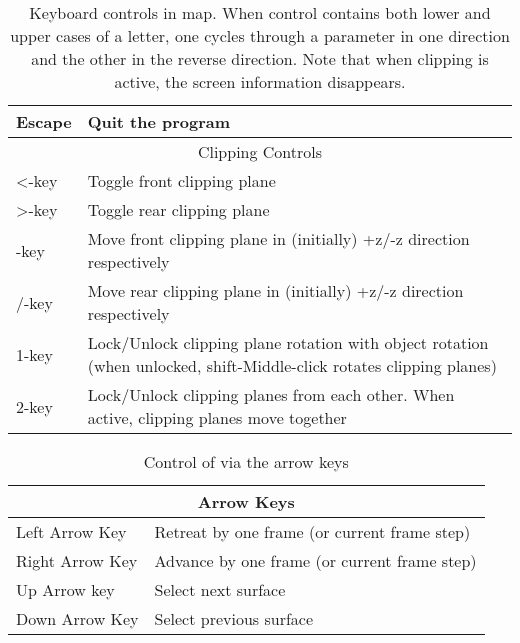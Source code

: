 \begin{table}[htbp]
\begin{center}
\begin{tabular}{|l|p{4in}|}
        Escape  &       Quit the program \\ \hline
        \multicolumn{2}{|c|}{Clipping Controls} \\ \hline
	<-key	& 	Toggle front clipping plane \\ \hline
        >-key   &       Toggle rear clipping plane \\ \hline
        [/]-key   &     Move front clipping plane in (initially) +z/-z
	direction respectively \\ \hline
	{/}-key   &	Move rear clipping plane in (initially) +z/-z
	direction respectively \\ \hline
	1-key	&	Lock/Unlock clipping plane rotation with object
	rotation (when unlocked, shift-Middle-click rotates clipping
	planes) \\ \hline
	2-key	&	Lock/Unlock clipping planes from each other.
	When active, clipping planes move together \\ \hline
\end{tabular}
\end{center}
\caption{Keyboard controls in map{}.  When control contains both lower 
and upper cases of a letter, one cycles through a parameter in one 
direction and the other in the reverse direction. Note that when clipping
is active, the screen information disappears.}
\label{table:keys} 
\end{table}

\begin{table}[htbp]
\begin{center}
\begin{tabular}{|l|l|} \hline
        \multicolumn{2}{|c||}{Arrow Keys} \\ \hline
        Left Arrow Key  &       Retreat by one frame (or current frame step) \\
        Right Arrow Key &       Advance by one frame (or current frame step) \\
        Up Arrow key    &       Select next surface \\
        Down Arrow Key  &       Select previous surface \\ \hline
\end{tabular}
\end{center}
\caption{Control of \map{} via the arrow keys}
\label{table:arrowkeys}
\end{table}


